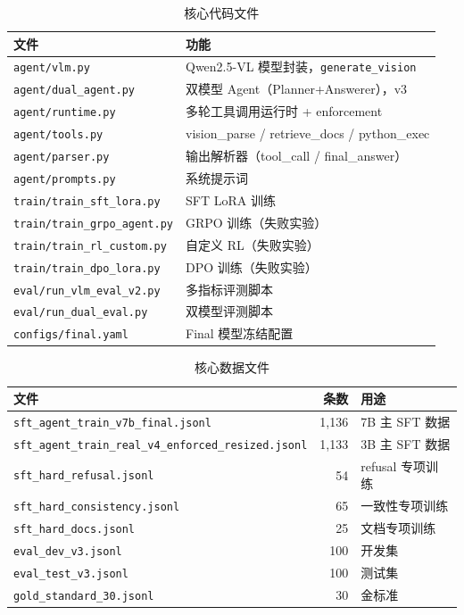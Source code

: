 \documentclass[12pt,a4paper]{ctexart}
\begin{document}
\begin{table}[H]
\centering
\caption{核心代码文件}
\begin{tabular}{ll}
\toprule
文件 & 功能 \\
\midrule
\texttt{agent/vlm.py} & Qwen2.5-VL 模型封装，\texttt{generate\_vision} \\
\texttt{agent/dual\_agent.py} & 双模型 Agent（Planner+Answerer），v3 \\
\texttt{agent/runtime.py} & 多轮工具调用运行时 + enforcement \\
\texttt{agent/tools.py} & vision\_parse / retrieve\_docs / python\_exec \\
\texttt{agent/parser.py} & 输出解析器（tool\_call / final\_answer） \\
\texttt{agent/prompts.py} & 系统提示词 \\
\texttt{train/train\_sft\_lora.py} & SFT LoRA 训练 \\
\texttt{train/train\_grpo\_agent.py} & GRPO 训练（失败实验） \\
\texttt{train/train\_rl\_custom.py} & 自定义 RL（失败实验） \\
\texttt{train/train\_dpo\_lora.py} & DPO 训练（失败实验） \\
\texttt{eval/run\_vlm\_eval\_v2.py} & 多指标评测脚本 \\
\texttt{eval/run\_dual\_eval.py} & 双模型评测脚本 \\
\texttt{configs/final.yaml} & Final 模型冻结配置 \\
\bottomrule
\end{tabular}
\end{table}

\begin{table}[H]
\centering
\caption{核心数据文件}
\begin{tabular}{lrl}
\toprule
文件 & 条数 & 用途 \\
\midrule
\texttt{sft\_agent\_train\_v7b\_final.jsonl} & 1,136 & 7B 主 SFT 数据 \\
\texttt{sft\_agent\_train\_real\_v4\_enforced\_resized.jsonl} & 1,133 & 3B 主 SFT 数据 \\
\texttt{sft\_hard\_refusal.jsonl} & 54 & refusal 专项训练 \\
\texttt{sft\_hard\_consistency.jsonl} & 65 & 一致性专项训练 \\
\texttt{sft\_hard\_docs.jsonl} & 25 & 文档专项训练 \\
\texttt{eval\_dev\_v3.jsonl} & 100 & 开发集 \\
\texttt{eval\_test\_v3.jsonl} & 100 & 测试集 \\
\texttt{gold\_standard\_30.jsonl} & 30 & 金标准 \\
\bottomrule
\end{tabular}
\end{table}
\end{document}

